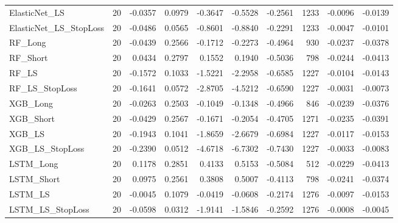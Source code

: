 \begin{tabular}{llrrrrrrrr}
\cline{1-10}
ElasticNet\_LS & 20 & -0.0357 & 0.0979 & -0.3647 & -0.5528 & -0.2561 & 1233 & -0.0096 & -0.0139 \\
\cline{1-10}
ElasticNet\_LS\_StopLoss & 20 & -0.0486 & 0.0565 & -0.8601 & -0.8840 & -0.2291 & 1233 & -0.0047 & -0.0101 \\
\cline{1-10}
RF\_Long & 20 & -0.0439 & 0.2566 & -0.1712 & -0.2273 & -0.4964 & 930 & -0.0237 & -0.0378 \\
\cline{1-10}
RF\_Short & 20 & 0.0434 & 0.2797 & 0.1552 & 0.1940 & -0.5036 & 798 & -0.0244 & -0.0413 \\
\cline{1-10}
RF\_LS & 20 & -0.1572 & 0.1033 & -1.5221 & -2.2958 & -0.6585 & 1227 & -0.0104 & -0.0143 \\
\cline{1-10}
RF\_LS\_StopLoss & 20 & -0.1641 & 0.0572 & -2.8705 & -4.5212 & -0.6590 & 1227 & -0.0031 & -0.0073 \\
\cline{1-10}
XGB\_Long & 20 & -0.0263 & 0.2503 & -0.1049 & -0.1348 & -0.4966 & 846 & -0.0239 & -0.0376 \\
\cline{1-10}
XGB\_Short & 20 & -0.0429 & 0.2567 & -0.1671 & -0.2054 & -0.4705 & 1271 & -0.0235 & -0.0391 \\
\cline{1-10}
XGB\_LS & 20 & -0.1943 & 0.1041 & -1.8659 & -2.6679 & -0.6984 & 1227 & -0.0117 & -0.0153 \\
\cline{1-10}
XGB\_LS\_StopLoss & 20 & -0.2390 & 0.0512 & -4.6718 & -6.7302 & -0.7430 & 1227 & -0.0033 & -0.0083 \\
\cline{1-10}
LSTM\_Long & 20 & 0.1178 & 0.2851 & 0.4133 & 0.5153 & -0.5084 & 512 & -0.0229 & -0.0413 \\
\cline{1-10}
LSTM\_Short & 20 & 0.0975 & 0.2561 & 0.3808 & 0.5007 & -0.4113 & 798 & -0.0241 & -0.0374 \\
\cline{1-10}
LSTM\_LS & 20 & -0.0045 & 0.1079 & -0.0419 & -0.0608 & -0.2174 & 1276 & -0.0097 & -0.0153 \\
\cline{1-10}
LSTM\_LS\_StopLoss & 20 & -0.0598 & 0.0312 & -1.9141 & -1.5846 & -0.2592 & 1276 & -0.0008 & -0.0045 \\
\cline{1-10}
\bottomrule
\end{tabular}
